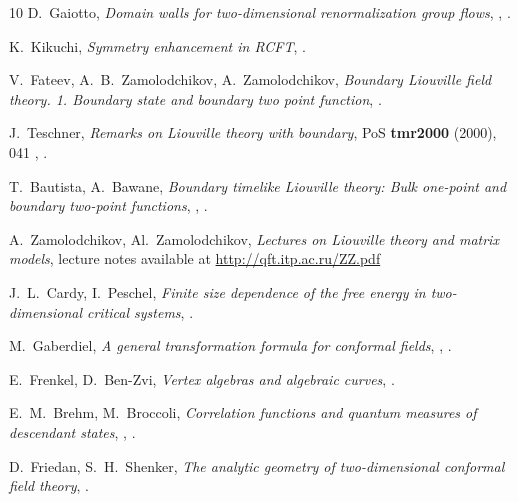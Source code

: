 \documentclass[11pt,a4paper]{article}
\numberwithin{equation}{section}
\begin{document}
\begin{thebibliography}{10}
D.~Gaiotto,
{\it Domain walls for two-dimensional renormalization group flows},
, .

K.~Kikuchi,
{\it Symmetry enhancement in RCFT},
.

V.~Fateev, A.~B.~Zamolodchikov, A.~Zamolodchikov,
\textit{Boundary Liouville field theory. 1. Boundary state and boundary two point function},
.

J.~Teschner,
\textit{Remarks on Liouville theory with boundary},
PoS \textbf{tmr2000} (2000), 041
,
.

T.~Bautista, A.~Bawane,
\textit{Boundary timelike Liouville theory: Bulk one-point and boundary two-point functions},
,
.

A.~Zamolodchikov, Al.~Zamolodchikov,
\textit{Lectures on Liouville theory and matrix models}, lecture notes available at
\href{http://qft.itp.ac.ru/ZZ.pdf}{http://qft.itp.ac.ru/ZZ.pdf}

J.~L.~Cardy, I.~Peschel,
{\it Finite size dependence of the free energy in two-dimensional critical systems},
.

M.~Gaberdiel,
\textit{A general transformation formula for conformal fields},
,
.

E.~Frenkel, D.~Ben-Zvi,
\textit{Vertex algebras and algebraic curves},
.

E.~M.~Brehm, M.~Broccoli,
\textit{Correlation functions and quantum measures of descendant states},
,
.

D.~Friedan, S.~H.~Shenker,
{\it The analytic geometry of two-dimensional conformal field theory},
.


\end{thebibliography}
\end{document}
